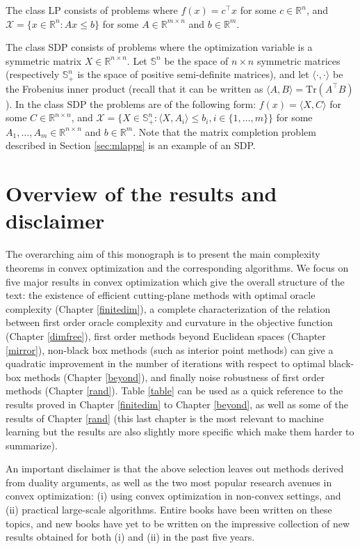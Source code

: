 \documentclass[openany]{now}
\newcommand{\tr}{\mathrm{Tr}}
\newcommand{\R}{\mathbb{R}}
\begin{document}
The class LP consists of problems where $f(x) = c^{\top} x$ for some $c \in \R^n$, and $\mathcal{X} = \{x \in \R^n : A x \leq b \}$ for some $A \in \R^{m \times n}$ and $b \in \R^m$.

The class SDP consists of problems where the optimization variable is a symmetric matrix $X \in \R^{n \times n}$. Let $\mathbb{S}^n$ be the space of $n\times n$ symmetric matrices (respectively $\mathbb{S}^n_+$ is the space of positive semi-definite matrices), and let $\langle \cdot, \cdot \rangle$ be the Frobenius inner product (recall that it can be written as $\langle A, B \rangle = \tr(A^{\top} B)$). In the class SDP the problems are of the following form: $f(x) = \langle X, C \rangle$ for some $C \in \R^{n \times n}$, and $\mathcal{X} = \{X \in \mathbb{S}^n_+ : \langle X, A_i \rangle \leq b_i, i \in \{1, \hdots, m\} \}$ for some $A_1, \hdots, A_m \in \R^{n \times n}$ and $b \in \R^m$. Note that the matrix completion problem described in Section \ref{sec:mlapps} is an example of an SDP.

\section{Overview of the results and disclaimer}
The overarching aim of this monograph is to present the main complexity theorems in convex optimization and the corresponding algorithms. We focus on five major results in convex optimization which give the overall structure of the text: the existence of efficient cutting-plane methods with optimal oracle complexity (Chapter \ref{finitedim}), a complete characterization of the relation between first order oracle complexity and curvature in the objective function (Chapter \ref{dimfree}), first order methods beyond Euclidean spaces (Chapter \ref{mirror}), non-black box methods (such as interior point methods) can give a quadratic improvement in the number of iterations with respect to optimal black-box methods (Chapter \ref{beyond}), and finally noise robustness of first order methods (Chapter \ref{rand}). Table \ref{table} can be used as a quick reference to the results proved in Chapter \ref{finitedim} to Chapter \ref{beyond}, as well as some of the results of Chapter \ref{rand} (this last chapter is the most relevant to machine learning but the results are also slightly more specific which make them harder to summarize).

An important disclaimer is that the above selection leaves out methods derived from duality arguments, as well as the two most popular research avenues in convex optimization: (i) using convex optimization in non-convex settings, and (ii) practical large-scale algorithms. Entire books have been written on these topics, and new books have yet to be written on the impressive collection of new results obtained for both (i) and (ii) in the past five years. 
\end{document}

